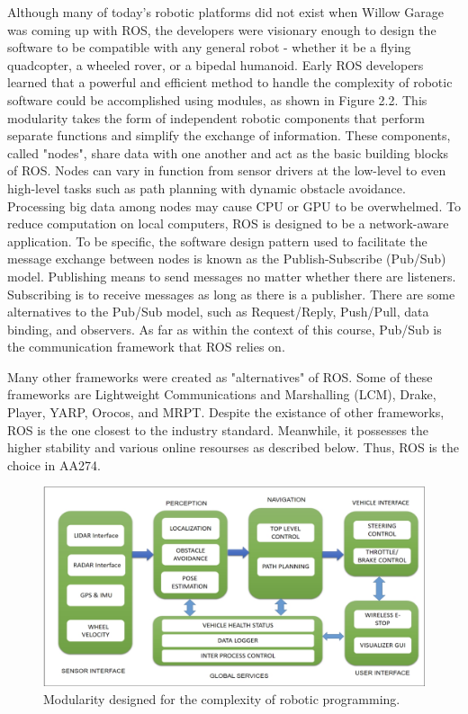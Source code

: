 \documentclass[twoside]{article}
\begin{document}
Although many of today's robotic platforms did not exist when Willow Garage was coming up with ROS, the developers were visionary enough to design the software to be compatible with any general robot - whether it be a flying quadcopter, a wheeled rover, or a bipedal humanoid. Early ROS developers learned that a powerful and efficient method to handle the complexity of robotic software could be accomplished using modules, as shown in Figure 2.2. This modularity takes the form of independent robotic components that perform separate functions and simplify the exchange of information. These components, called "nodes", share data with one another and act as the basic building blocks of ROS. Nodes can vary in function from sensor drivers at the low-level to even high-level tasks such as path planning with dynamic obstacle avoidance. Processing big data among nodes may cause CPU or GPU to be overwhelmed. To reduce computation on local computers, ROS is designed to be a network-aware application. To be specific, the software design pattern used to facilitate the message exchange between nodes is known as the Publish-Subscribe (Pub/Sub) model. Publishing means to send messages no matter whether there are listeners. Subscribing is to receive messages as long as there is a publisher. There are some alternatives to the Pub/Sub model, such as Request/Reply, Push/Pull, data binding, and observers. As far as within the context of this course, Pub/Sub is the communication framework that ROS relies on.

Many other frameworks were created as "alternatives" of ROS. Some of these frameworks are Lightweight Communications and Marshalling (LCM), Drake, Player, YARP, Orocos, and MRPT. Despite the existance of other frameworks, ROS is the one closest to the industry standard. Meanwhile, it possesses the higher stability and various online resourses as described below. Thus, ROS is the choice in AA274. 
\begin{figure}[ht]
\centering
\includegraphics[width=1\textwidth]{ModularityPhoto}
\caption{Modularity designed for the complexity of robotic programming.}
\end{figure}
\end{document}
